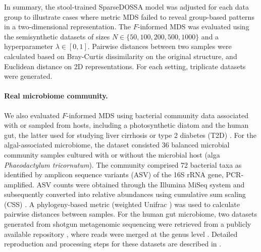 \documentclass[10pt,letterpaper]{article}
\newcommand{\1}{{\rm 1}\kern-0.24em{\rm I}}
\begin{document}
In summary, the stool-trained SparseDOSSA model was adjusted for each data group to illustrate cases where metric MDS failed to reveal group-based patterns in a two-dimensional representation. The $F$-informed MDS was evaluated using the semisynthetic datasets of sizes $N\in\{50,100,200,500,1000\}$ and a hyperparameter $\lambda\in[0, 1]$. Pairwise distances between two samples were calculated based on Bray-Curtis dissimilarity on the original structure, and Euclidean distance on 2D representations. For each setting, triplicate datasets were generated.

\paragraph*{Real microbiome community.}
We also evaluated $F$-informed MDS using bacterial community data associated with or sampled from hosts, including a photosynthetic diatom \cite{kim22} and the human gut, the latter used for studying liver cirrhosis \cite{Qin14} or type 2 diabetes (T2D) \cite{Karlsson13, Qin12}. 
For the algal-associated microbiome, the dataset consisted 36 balanced microbial community samples cultured with or without the microbial host (alga \textit{Phaeodactylum tricornutum}). The community comprised 72 bacterial taxa as identified by amplicon sequence variants (ASV) of the 16S rRNA gene, PCR-amplified. ASV counts were obtained through the Illumina MiSeq system and subsequently converted into relative abundances using cumulative sum scaling (CSS) \cite{paulson13}. A phylogeny-based metric (weighted Unifrac \cite{lozupone07}) was used to calculate pairwise distances between samples.
For the human gut microbiome, two datasets generated from shotgun metagenomic sequencing were retrieved from a publicly available repository \cite{Pasolli16}, where reads were merged at the genus level \cite{reiman20}. Detailed reproduction and processing steps for these datasets are described in .
\end{document}
